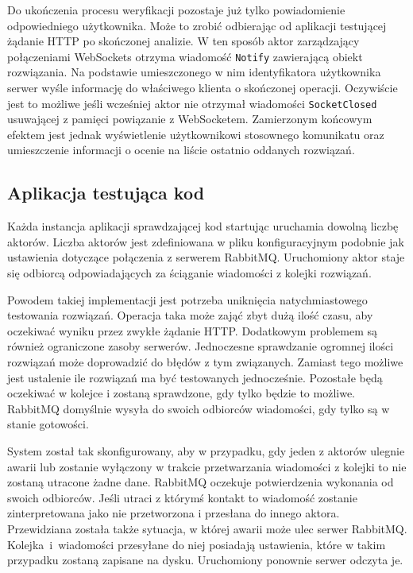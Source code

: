 \documentclass[wimgr]{xmgr}
\begin{document}
Do ukończenia procesu weryfikacji pozostaje już tylko powiadomienie odpowiedniego użytkownika. Może to zrobić odbierając od aplikacji testującej żądanie HTTP po skończonej analizie. W ten sposób aktor zarządzający połączeniami WebSockets otrzyma wiadomość \texttt{Notify} zawierającą obiekt rozwiązania. Na podstawie umieszczonego w nim identyfikatora użytkownika serwer wyśle informację do właściwego klienta o skończonej operacji. Oczywiście jest to możliwe jeśli wcześniej aktor nie otrzymał wiadomości \texttt{SocketClosed} usuwającej z pamięci powiązanie z WebSocketem. Zamierzonym końcowym efektem jest jednak wyświetlenie użytkownikowi stosownego komunikatu oraz umieszczenie informacji o ocenie na liście ostatnio oddanych rozwiązań. 

\subsection{Aplikacja testująca kod}
 
Każda instancja aplikacji sprawdzającej kod startując uruchamia dowolną liczbę aktorów. Liczba aktorów jest zdefiniowana w pliku konfiguracyjnym podobnie jak ustawienia dotyczące połączenia z serwerem RabbitMQ. Uruchomiony aktor staje się odbiorcą odpowiadających za ściąganie wiadomości z kolejki rozwiązań. 

Powodem takiej implementacji jest potrzeba uniknięcia natychmiastowego testowania rozwiązań. Operacja taka może zająć zbyt dużą ilość czasu, aby oczekiwać wyniku przez zwykłe żądanie HTTP. Dodatkowym problemem są również ograniczone zasoby serwerów. Jednoczesne sprawdzanie ogromnej ilości rozwiązań może doprowadzić do błędów z tym związanych. Zamiast tego możliwe jest ustalenie ile rozwiązań ma być testowanych jednocześnie. Pozostałe będą oczekiwać w kolejce i zostaną sprawdzone, gdy tylko będzie to możliwe. RabbitMQ domyślnie wysyła do swoich odbiorców wiadomości, gdy tylko są w stanie gotowości.

System został tak skonfigurowany, aby w przypadku, gdy jeden z aktorów ulegnie awarii lub zostanie wyłączony w trakcie przetwarzania wiadomości z kolejki to nie zostaną utracone żadne dane. RabbitMQ oczekuje potwierdzenia wykonania od swoich odbiorców. Jeśli utraci z którymś kontakt to wiadomość zostanie zinterpretowana jako nie przetworzona i przesłana do innego aktora. Przewidziana została także sytuacja, w której awarii może ulec serwer RabbitMQ. Kolejka~i~wiadomości przesyłane do niej posiadają ustawienia, które w takim przypadku zostaną zapisane na dysku. Uruchomiony ponownie serwer odczyta je. 
\end{document}
